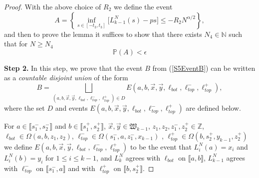 \begin{proof}
	With the above choice of $R_2$ we define the event
	\begin{equation}\label{S5EventA}
		A = \left\{\inf_{s \in [ -t_3, t_3 ]}\big[L^N_{k-1}(s) - p s \big] \leq - R_2N^{\alpha/2}\right\},
	\end{equation}
	and then to prove the lemma it suffices to show that there exists $N_4 \in \mathbb{N}$ such that for $N \geq N_4$ 
	\begin{equation}\label{4.3Abound}
		\mathbb{P}(A) < \epsilon
	\end{equation}
	
	
	\noindent\textbf{Step 2.} In this step, we prove that the event $B$ from (\ref{S5EventB}) can be written as a \textit{countable disjoint union} of the form
	\begin{equation}\label{4.3disj}
		B = \bigsqcup_{(a,b,\vec{x},\vec{y},\ell_{bot}, \ell_{top}^-, \ell_{top}^+)\in D} E(a,b,\vec{x},\vec{y},\ell_{bot},\ell_{top}^-, \ell_{top}^+),
	\end{equation}
	where the set $D$ and events $E(a,b,\vec{x},\vec{y},\ell_{bot},\ell_{top}^-, \ell_{top}^+)$ are defined below.
	
	For $a \in \llbracket s_1^-, s_2^- \rrbracket$ and $b \in \llbracket s_1^+, s_2^+ \rrbracket$, $\vec{x},\vec{y}\in\mathfrak{W}_{k-1}$, $z_1,z_2,z_1^-, z_2^+\in\mathbb{Z}$, $\ell_{bot} \in \Omega(a, b, z_1, z_2)$, $\ell_{top}^- \in \Omega(s_1^-, a, z_1^-, x_{k-1})$ , $\ell_{top}^+ \in \Omega(b, s_2^+, y_{k-1}, z_2^+)$ we define $E(a,b,\vec{x},\vec{y},\ell_{bot}, \ell_{top}^-, \ell_{top}^+)$ to be the event that $L_i^N(a) = x_i$ and $L_i^N(b) = y_i$ for $1\leq i\leq k-1$, and $L_k^N$ agrees with $\ell_{bot}$ on $\llbracket a,b \rrbracket$, $L_{k-1}^N$ agrees with $\ell_{top}^-$ on $\llbracket s_1^-, a \rrbracket$ and with $\ell_{top}^+$ on $\llbracket b, s_2^+ \rrbracket$.
	

\end{proof}
